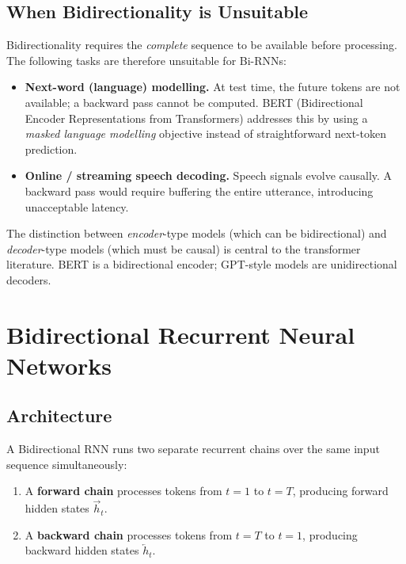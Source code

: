 \documentclass[12pt,a4paper]{article}
\begin{document}
\subsection{When Bidirectionality is Unsuitable}
\label{subsec:unsuitable}

Bidirectionality requires the \emph{complete} sequence to be available before
processing.  The following tasks are therefore unsuitable for Bi-RNNs:

\begin{itemize}
  \item \textbf{Next-word (language) modelling.}  At test time, the future
        tokens are not available; a backward pass cannot be computed.
        BERT (Bidirectional Encoder Representations from Transformers) addresses
        this by using a \emph{masked language modelling} objective instead of
        straightforward next-token prediction.
  \item \textbf{Online / streaming speech decoding.}  Speech signals evolve
        causally.  A backward pass would require buffering the entire utterance,
        introducing unacceptable latency.
\end{itemize}

\begin{keyinsight}
  The distinction between \emph{encoder}-type models (which can be
  bidirectional) and \emph{decoder}-type models (which must be causal) is
  central to the transformer literature.  BERT is a bidirectional encoder;
  GPT-style models are unidirectional decoders.
\end{keyinsight}

\section{Bidirectional Recurrent Neural Networks}
\label{sec:birnn}

\subsection{Architecture}
\label{subsec:birnn_arch}

A Bidirectional RNN runs two separate recurrent chains over the same input
sequence simultaneously:

\begin{enumerate}
  \item A \textbf{forward chain} processes tokens from $t=1$ to $t=T$,
        producing forward hidden states $\overrightarrow{h}_t$.
  \item A \textbf{backward chain} processes tokens from $t=T$ to $t=1$,
        producing backward hidden states $\overleftarrow{h}_t$.
\end{enumerate}
\end{document}
